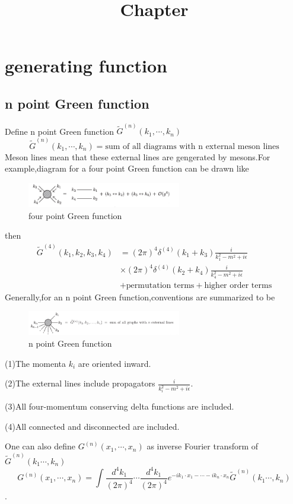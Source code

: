 \documentclass[a4paper]{article}
\begin{document}
	\title{Chapter}
	\date{ }
	\maketitle
\section{generating function}
\subsection{n point Green function}
Define n point Green function $\tilde{G}^{(n)}(k_1,\cdots,k_n)$
$$\tilde{G}^{(n)}(k_1,\cdots,k_n)=\text{sum of all diagrams with n external meson lines}$$Meson lines mean that these external lines are gengerated by mesons.For example,diagram for a four point Green function can be drawn like
\begin{figure}[htbp]
	\centering
	\includegraphics[width=0.6\textwidth]{19.png}
	\caption{four point Green function}
\end{figure}

then
\begin{align*}
	\tilde{G}^{(4)}(k_1,k_2,k_3,k_4)&=(2\pi)^4\delta^{(4)}(k_1+k_3)\frac{i}{k_1^2-m^2+i\epsilon}\\&\times(2\pi)^4\delta^{(4)}(k_2+k_4)\frac{i}{k_4^2-m^2+i\epsilon}\\&+\text{permutation terms}+\text{higher order terms}
\end{align*}
Generally,for an n point Green function,conventions are summarized to be
\begin{figure}[htbp]
	\centering
	\includegraphics[width=0.6\textwidth]{20.png}
	\caption{n point Green function}
\end{figure}

\par (1)The momenta $k_i$ are oriented inward.
\par (2)The external lines include propagators $\frac{i}{k_i^2-m^2+i\epsilon}$.
\par (3)All four-momentum conserving delta functions are included.
\par (4)All connected and disconnected are included.
\vspace{0.02\textheight}
\par One can also define $G^{(n)}(x_1,\cdots,x_n)$ as inverse Fourier transform of $\tilde{G}^{(n)}(k_1\cdots,k_n)$ 
$$G^{(n)}(x_1,\cdots,x_n)=\int\frac{d^4k_1}{(2\pi)^4}\cdots\frac{d^4k_1}{(2\pi)^4}e^{-ik_1\cdot x_1-\cdots-ik_n\cdot x_n}\tilde{G}^{(n)}(k_1\cdots,k_n)$$.
\end{document}
